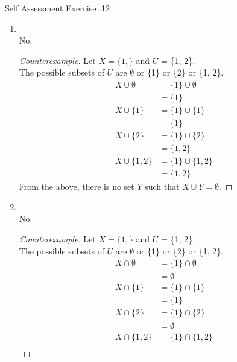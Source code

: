 \documentclass[../notes.tex]{subfiles}
\begin{document}
\begin{exercise}{Self Assessment Exercise \thechapter.12}
\begin{enumerate}
\begin{proof}
\begin{enumerate}[label=(\roman*)]
							\end{enumerate}
							As the first claim is false, it is not the case that $V \cap W = \emptyset$ iff $V = \emptyset$ or $W = \emptyset$.
						\end{proof}
					\pagebreak
					\item {}\\
						No.
						\begin{proof}[Counterexample]
							Let $X = \{1,\}$ and $U$ = \{1, 2\}.\\
							The possible subsets of $U$ are $\emptyset$ or \{1\} or \{2\} or \{1, 2\}.
							\begin{align*}
								X \cup \emptyset &= \{1\} \cup \emptyset\\
								&= \{1\}\\
								X \cup \{1\} &= \{1\} \cup \{1\}\\
								&= \{1\}\\
								X \cup \{2\} &= \{1\} \cup \{2\}\\
								&= \{1, 2\}\\
								X \cup \{1, 2\} &= \{1\} \cup \{1, 2\}\\
								&= \{1, 2\}
							\end{align*}
							From the above, there is no set $Y$ such that $X \cup Y = \emptyset$.
						\end{proof}
					\item {}\\
						No.
						\begin{proof}[Counterexample]
							Let $X = \{1,\}$ and $U$ = \{1, 2\}.\\
							The possible subsets of $U$ are $\emptyset$ or \{1\} or \{2\} or \{1, 2\}.
							\begin{align*}
								X \cap \emptyset &= \{1\} \cap \emptyset\\
								&= \emptyset\\
								X \cap \{1\} &= \{1\} \cap \{1\}\\
								&= \{1\}\\
								X \cap \{2\} &= \{1\} \cap \{2\}\\
								&= \emptyset\\
								X \cap \{1, 2\} &= \{1\} \cap \{1, 2\}\\

\end{align*}
\end{proof}
\end{enumerate}
\end{exercise}
\end{document}

